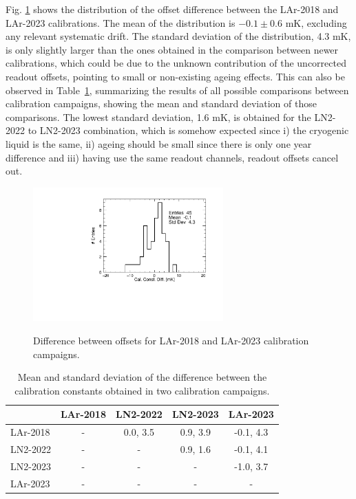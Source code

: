 \noindent Fig. \ref{fig:LAr2018AllDiff} shows the distribution of the offset difference between the LAr-2018 and LAr-2023 calibrations. The mean of the distribution is $-0.1\pm0.6$ mK, excluding any relevant systematic drift. The standard deviation of the distribution, 4.3 mK, is only slightly larger than the ones obtained in the comparison between newer calibrations, which could be due to the unknown contribution of the uncorrected readout offsets, pointing to small or non-existing ageing effects. This can also be observed in Table~\ref{tab:calib_comparison}, summarizing the results of all possible comparisons between calibration campaigns, showing the mean and standard deviation of those comparisons. The lowest standard deviation, 1.6 mK, is obtained for the LN2-2022 to LN2-2023 combination, which is somehow expected since i) the cryogenic liquid is the same, ii) ageing should be small since there is only one year difference and iii) having use the same readout channels, readout offsets cancel out.

\begin{figure}[htbp]
\centering
{\includegraphics[width=0.65\textwidth]{images/figure_22.pdf}}
\caption{Difference between offsets for LAr-2018 and LAr-2023 calibration campaigns.}
\label{fig:LAr2018AllDiff}
\end{figure}

\begin{table}[htbp]
\begin{center}
\begin{tabular}{l c c c c}
         & LAr-2018 & LN2-2022 & LN2-2023 & LAr-2023  \\ \hline
LAr-2018 &    -     & 0.0, 3.5& 0.9, 3.9 & -0.1, 4.3 \\
LN2-2022 &    -     &    -     & 0.9, 1.6 &  -0.1, 4.1 \\
LN2-2023 &    -     &    -     &    -     & -1.0, 3.7 \\
LAr-2023 &    -     &    -     &    -     &     -     \\
\end{tabular}
\end{center}
\caption{Mean and standard deviation of the difference between the calibration constants obtained in two calibration campaigns.}
\label{tab:calib_comparison}
\end{table}

